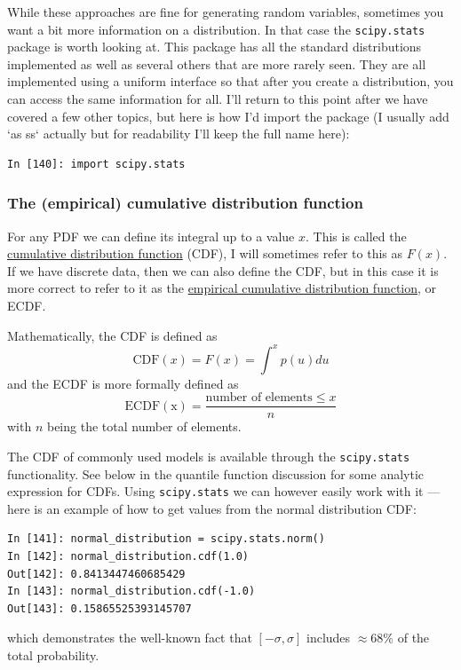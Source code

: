 \documentclass[a4paper,10pt]{article}
\newcommand{\link}[2]{{\color{blue}\href{#1}{#2}}}
\begin{document}
While these approaches are fine for generating random variables, sometimes you want a bit more information on a distribution. In that case the \texttt{scipy.stats} package is worth looking at. This package has all the standard distributions implemented as well as several others that are more rarely seen. They are all implemented using a uniform interface so that after you create a distribution, you can access the same information for all. I'll return to this point after we have covered a few other topics, but here is how I'd import the package (I usually add `as ss` actually but for readability I'll keep the full name here):
\begin{lstlisting}
In [140]: import scipy.stats 
\end{lstlisting}


\subsubsection{ The (empirical) cumulative distribution function}

For any PDF we can define its integral up to a value $x$. This is called the \link{https://en.wikipedia.org/wiki/Cumulative_distribution_function}{cumulative distribution function} (CDF), I will sometimes refer to this as $F(x)$. If we have discrete data, then we can also define the CDF, but in this case it is more correct to refer to it as the \link{https://en.wikipedia.org/wiki/Empirical_distribution_function}{empirical cumulative distribution function}, or ECDF.

Mathematically, the CDF is defined as
$$\mathrm{CDF}(x) = F(x) = \int^x p(u) du$$
and the ECDF is more formally defined as
$$\mathrm{ECDF(x)} = \frac{\mbox{number of elements}\le x}{n}$$
with $n$ being the total number of elements.

The CDF of commonly used models is available through the \texttt{scipy.stats} functionality. See below in the quantile function discussion for some analytic expression for CDFs. Using \texttt{scipy.stats} we can however easily work with it --- here is an example of how to get values from the normal distribution CDF:
\begin{lstlisting}
In [141]: normal_distribution = scipy.stats.norm() 
In [142]: normal_distribution.cdf(1.0)                                                                          
Out[142]: 0.8413447460685429
In [143]: normal_distribution.cdf(-1.0)                                                                         
Out[143]: 0.15865525393145707
\end{lstlisting}
which demonstrates the well-known fact that $[-\sigma, \sigma]$ includes $\approx 68\%$ of the total probability. 
\end{document}
